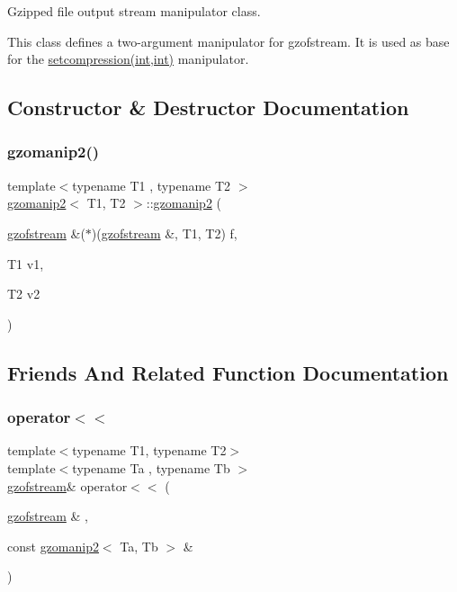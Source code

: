 Gzipped file output stream manipulator class. 

This class defines a two-\/argument manipulator for gzofstream. It is used as base for the \mbox{\hyperlink{_2zfstream_8h_a9faf10ab9ba2398c393ad3691421c180}{setcompression(int,int)}} manipulator. 

\subsection{Constructor \& Destructor Documentation}
\mbox{\label{classgzomanip2_a6e3980ce2fa39e29ecfa537bb8e9ddb0}} 
\subsubsection{\texorpdfstring{gzomanip2()}{gzomanip2()}}
{\footnotesize\ttfamily template$<$typename T1 , typename T2 $>$ \\
\mbox{\hyperlink{classgzomanip2}{gzomanip2}}$<$ T1, T2 $>$\+::\mbox{\hyperlink{classgzomanip2}{gzomanip2}} (\begin{DoxyParamCaption}\item[{\mbox{\hyperlink{classgzofstream}{gzofstream}} \&($\ast$)(\mbox{\hyperlink{classgzofstream}{gzofstream}} \&, T1, T2)}]{f,  }\item[{T1}]{v1,  }\item[{T2}]{v2 }\end{DoxyParamCaption})\hspace{0.3cm}{\ttfamily [inline]}}



\subsection{Friends And Related Function Documentation}
\mbox{\label{classgzomanip2_a2382d2b86b2af773d17c2bc349fddb4f}} 
\subsubsection{\texorpdfstring{operator$<$$<$}{operator<<}}
{\footnotesize\ttfamily template$<$typename T1, typename T2$>$ \\
template$<$typename Ta , typename Tb $>$ \\
\mbox{\hyperlink{classgzofstream}{gzofstream}}\& operator$<$$<$ (\begin{DoxyParamCaption}\item[{\mbox{\hyperlink{classgzofstream}{gzofstream}} \&}]{,  }\item[{const \mbox{\hyperlink{classgzomanip2}{gzomanip2}}$<$ Ta, Tb $>$ \&}]{ }\end{DoxyParamCaption})\hspace{0.3cm}{\ttfamily [friend]}}




